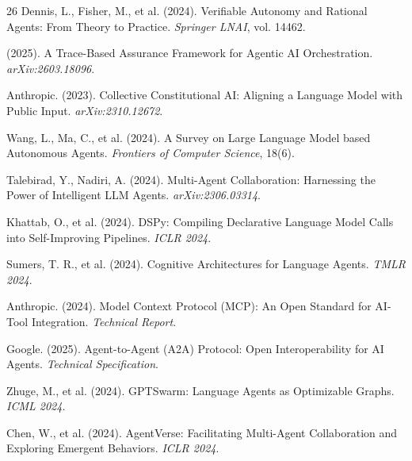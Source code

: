 \documentclass[12pt,a4paper]{article}
\begin{document}
\begin{thebibliography}{26}
 Dennis, L., Fisher, M., et al. (2024). Verifiable Autonomy and Rational Agents: From Theory to Practice. \textit{Springer LNAI}, vol. 14462.

 (2025). A Trace-Based Assurance Framework for Agentic AI Orchestration. \textit{arXiv:2603.18096}.

 Anthropic. (2023). Collective Constitutional AI: Aligning a Language Model with Public Input. \textit{arXiv:2310.12672}.

 Wang, L., Ma, C., et al. (2024). A Survey on Large Language Model based Autonomous Agents. \textit{Frontiers of Computer Science}, 18(6).

 Talebirad, Y., Nadiri, A. (2024). Multi-Agent Collaboration: Harnessing the Power of Intelligent LLM Agents. \textit{arXiv:2306.03314}.

 Khattab, O., et al. (2024). DSPy: Compiling Declarative Language Model Calls into Self-Improving Pipelines. \textit{ICLR 2024}.

 Sumers, T. R., et al. (2024). Cognitive Architectures for Language Agents. \textit{TMLR 2024}.

 Anthropic. (2024). Model Context Protocol (MCP): An Open Standard for AI-Tool Integration. \textit{Technical Report}.

 Google. (2025). Agent-to-Agent (A2A) Protocol: Open Interoperability for AI Agents. \textit{Technical Specification}.

 Zhuge, M., et al. (2024). GPTSwarm: Language Agents as Optimizable Graphs. \textit{ICML 2024}.

 Chen, W., et al. (2024). AgentVerse: Facilitating Multi-Agent Collaboration and Exploring Emergent Behaviors. \textit{ICLR 2024}.

\end{thebibliography}
\end{document}
